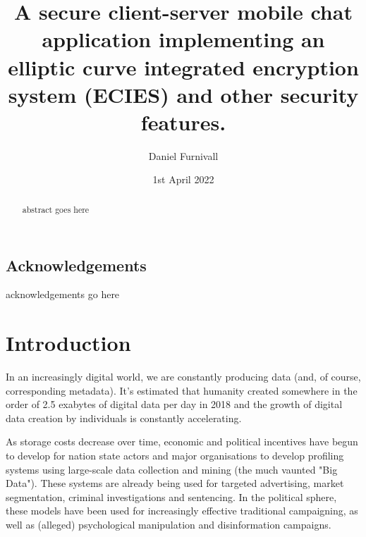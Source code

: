 \documentclass{mproj}
\begin{document}

\title{A secure client-server mobile chat application implementing an elliptic curve integrated encryption system (ECIES) and other security features.}
\author{Daniel Furnivall}
\date{1st April 2022}
\maketitle

\begin{abstract}
abstract goes here
\end{abstract}

\educationalconsent


\newpage
\section*{Acknowledgements}

acknowledgements go here

\tableofcontents


\chapter{Introduction}\label{intro} \setcounter{page}{1} 

In an increasingly digital world, we are constantly producing data (and, of course, corresponding metadata). It's estimated that humanity created somewhere in the order of 2.5 exabytes of digital data per day in 2018\cite{baeza2022attention} and the growth of digital data creation by individuals is constantly accelerating. 

As storage costs decrease over time\cite{walter2005kryder}, economic and political incentives have begun to develop for nation state actors and major organisations to develop profiling systems using large-scale data collection and mining (the much vaunted "Big Data"). These systems are already being used for targeted advertising\cite{farahat2012effective}, market segmentation\cite{pantelis2013understanding}, criminal investigations\cite{zawoad2015digital} and sentencing\cite{simmons2017big}. In the political sphere, these models have been used for increasingly effective traditional campaigning, \cite{kreiss2019arbiters} as well as (alleged) psychological manipulation\cite{berghel2018malice} and disinformation\cite{stocker2019facebook} campaigns.
\end{document}
